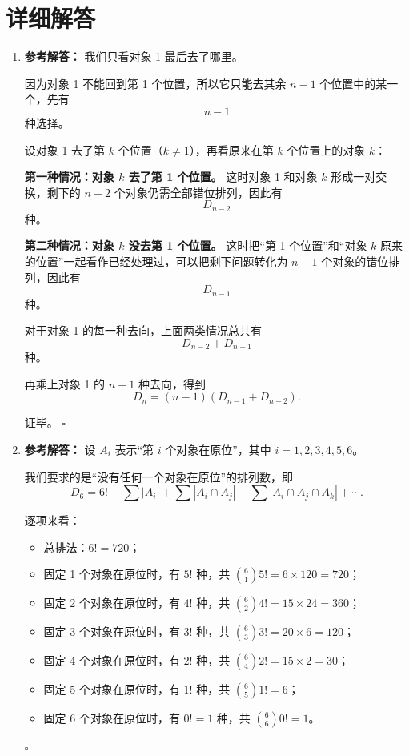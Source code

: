 \documentclass[11pt,a4paper,fontset=fandol]{ctexart}
\newenvironment{solution}{\par\noindent\textbf{参考解答：}}{\hfill$\square$\par}
\begin{document}
\newpage
\section{详细解答}

\begin{enumerate}
  \item \begin{solution}
  我们只看对象 1 最后去了哪里。

  因为对象 1 不能回到第 1 个位置，所以它只能去其余 $n-1$ 个位置中的某一个，先有
  \[
  n-1
  \]
  种选择。

  设对象 1 去了第 $k$ 个位置（$k\neq 1$），再看原来在第 $k$ 个位置上的对象 $k$：

  \textbf{第一种情况：对象 $k$ 去了第 1 个位置。}  
  这时对象 1 和对象 $k$ 形成一对交换，剩下的 $n-2$ 个对象仍需全部错位排列，因此有
  \[
  D_{n-2}
  \]
  种。

  \textbf{第二种情况：对象 $k$ 没去第 1 个位置。}  
  这时把“第 1 个位置”和“对象 $k$ 原来的位置”一起看作已经处理过，可以把剩下问题转化为 $n-1$ 个对象的错位排列，因此有
  \[
  D_{n-1}
  \]
  种。

  对于对象 1 的每一种去向，上面两类情况总共有
  \[
  D_{n-2}+D_{n-1}
  \]
  种。

  再乘上对象 1 的 $n-1$ 种去向，得到
  \[
  D_n=(n-1)(D_{n-1}+D_{n-2}).
  \]

  证毕。
  \end{solution}

  \item \begin{solution}
  设 $A_i$ 表示“第 $i$ 个对象在原位”，其中 $i=1,2,3,4,5,6$。

  我们要求的是“没有任何一个对象在原位”的排列数，即
  \[
  D_6=6!-\sum |A_i|+\sum |A_i\cap A_j|-\sum |A_i\cap A_j\cap A_k|+\cdots.
  \]

  逐项来看：
  \begin{itemize}
    \item 总排法：$6!=720$；
    \item 固定 1 个对象在原位时，有 $5!$ 种，共 $\binom61 5!=6\times 120=720$；
    \item 固定 2 个对象在原位时，有 $4!$ 种，共 $\binom62 4!=15\times 24=360$；
    \item 固定 3 个对象在原位时，有 $3!$ 种，共 $\binom63 3!=20\times 6=120$；
    \item 固定 4 个对象在原位时，有 $2!$ 种，共 $\binom64 2!=15\times 2=30$；
    \item 固定 5 个对象在原位时，有 $1!$ 种，共 $\binom65 1!=6$；
    \item 固定 6 个对象在原位时，有 $0!=1$ 种，共 $\binom66 0!=1$。
  \end{itemize}


\end{solution}
\end{enumerate}
\end{document}
